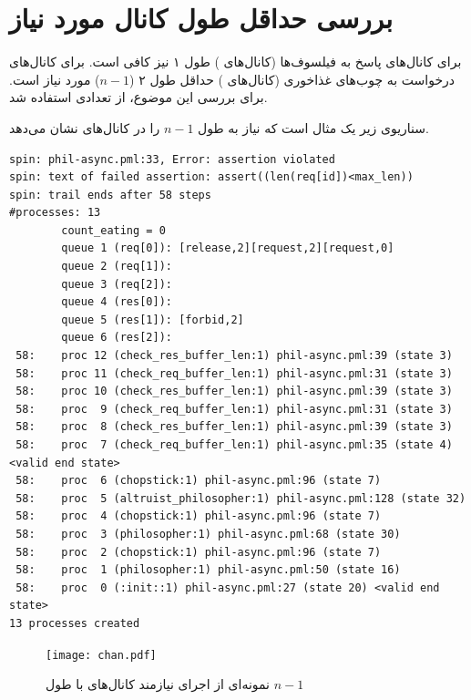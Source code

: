 \documentclass[12pt, logo=tehranReport/logo]{tehranReport}
\begin{document}
\section{بررسی حداقل طول کانال مورد نیاز}

برای کانال‌های پاسخ به فیلسوف‌ها (کانال‌های ) طول ۱ نیز کافی است.
برای کانال‌های درخواست به چوب‌های غذاخوری (کانال‌های ) حداقل طول ۲ ($n - 1$) مورد نیاز است.
برای بررسی این موضوع، از تعدادی  استفاده شد.

سناریوی زیر یک مثال است که نیاز به طول $n - 1$ را در کانال‌های  نشان می‌دهد.

\begin{latin}
\small
\begin{verbatim}
spin: phil-async.pml:33, Error: assertion violated
spin: text of failed assertion: assert((len(req[id])<max_len))
spin: trail ends after 58 steps
#processes: 13
        count_eating = 0
        queue 1 (req[0]): [release,2][request,2][request,0]
        queue 2 (req[1]): 
        queue 3 (req[2]): 
        queue 4 (res[0]): 
        queue 5 (res[1]): [forbid,2]
        queue 6 (res[2]): 
 58:    proc 12 (check_res_buffer_len:1) phil-async.pml:39 (state 3)
 58:    proc 11 (check_req_buffer_len:1) phil-async.pml:31 (state 3)
 58:    proc 10 (check_res_buffer_len:1) phil-async.pml:39 (state 3)
 58:    proc  9 (check_req_buffer_len:1) phil-async.pml:31 (state 3)
 58:    proc  8 (check_res_buffer_len:1) phil-async.pml:39 (state 3)
 58:    proc  7 (check_req_buffer_len:1) phil-async.pml:35 (state 4) <valid end state>
 58:    proc  6 (chopstick:1) phil-async.pml:96 (state 7)
 58:    proc  5 (altruist_philosopher:1) phil-async.pml:128 (state 32)
 58:    proc  4 (chopstick:1) phil-async.pml:96 (state 7)
 58:    proc  3 (philosopher:1) phil-async.pml:68 (state 30)
 58:    proc  2 (chopstick:1) phil-async.pml:96 (state 7)
 58:    proc  1 (philosopher:1) phil-async.pml:50 (state 16)
 58:    proc  0 (:init::1) phil-async.pml:27 (state 20) <valid end state>
13 processes created
\end{verbatim}
\end{latin}

\begin{figure}[H]
\centering
\texttt{[image: chan.pdf]}
\caption{نمونه‌ای از اجرای نیازمند کانال‌های  با طول $n-1$}
\end{figure}
\end{document}
